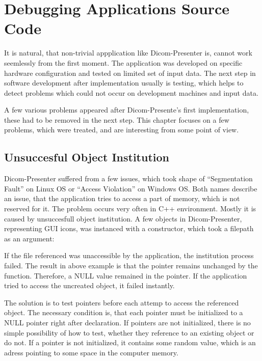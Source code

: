\chapter{Debugging Applications Source Code}
\vspace{-10mm}
It is natural, that non-trivial appplication like Dicom-Presenter is, cannot work seemlessly from the first moment. The application was developed on specific hardware configuration and tested on limited set of input data. The next step in software development after implementation usually is testing, which helps to detect problems which could not occur on development machines and input data.

A few various problems appeared after Dicom-Presente's first implementation, these had to be removed in the next step. This chapter focuses on a few problems, which were treated, and are interesting from some point of view.

\section{Unsuccesful Object Institution}
Dicom-Presenter suffered from a few issues, which took shape of ``Segmentation Fault'' on Linux OS or ``Access Violation'' on Windows OS. Both names describe an issue, that the application tries to access a part of memory, which is not reserved for it. The problem occurs very often in C++ environment. Mostly it is caused by unsuccesfull object institution. A few objects in Dicom-Presenter, representing GUI icons, was instanced with a constructor, which took a filepath as an argument:


If the file referenced was unaccessible by the application, the institution process failed. The result in above example is that the  pointer remains unchanged by the  function. Therefore, a NULL value remained in the pointer. If the application tried to access the uncreated object, it failed instantly.

The solution is to test pointers before each attemp to access the referenced object. The necessary condition is, that each pointer  must be initialized to a NULL pointer right after declaration. If pointers are not initialized, there is no simple possibility of how to test, whether they reference to an existing object or do not. If a pointer is not initialized, it contains some random value, which is an adress pointing to some space in the computer memory.

